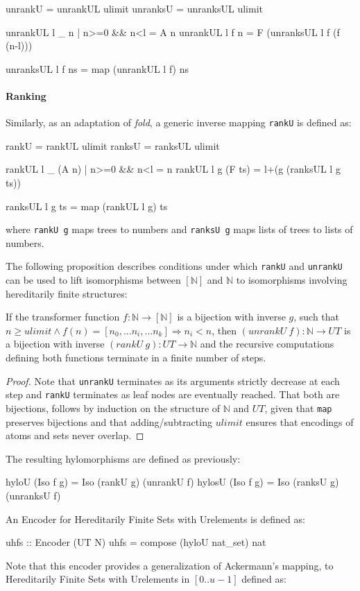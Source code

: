 \documentclass[]{INCLUDES/llncs}
\begin{document}
\begin{code}
unrankU = unrankUL ulimit
unranksU = unranksUL ulimit

unrankUL l _ n | n>=0 && n<l = A n
unrankUL l f n = F (unranksUL l f (f (n-l)))

unranksUL l f ns =  map (unrankUL l f) ns
\end{code}

\paragraph*{Ranking} Similarly, as an adaptation of {\em fold}, a generic
inverse mapping {\tt rankU} is defined as:
\begin{code}
rankU = rankUL ulimit
ranksU = ranksUL ulimit

rankUL l _ (A n) | n>=0 && n<l = n
rankUL l g (F ts) = l+(g (ranksUL l g ts))

ranksUL l g ts = map (rankUL l g) ts
\end{code}
where {\tt rankU g} maps trees to numbers and
{\tt ranksU g} maps lists of trees to lists of numbers.

The following proposition describes conditions under which
{\tt rankU} and {\tt unrankU} can be used to lift isomorphisms
between $[\mathbb{N}]$ and $\mathbb{N}$ to isomorphisms involving
hereditarily finite structures:

\begin{prop}
If the transformer function $f:\mathbb{N} \rightarrow [\mathbb{N}]$ is a bijection 
with inverse $g$, such that 
$n \geq ulimit \wedge f(n)=[n_0,...n_i,...n_k] \Rightarrow n_i<n$, 
then $(unrankU~f) : \mathbb{N} \rightarrow UT$ 
is a bijection  
with inverse $(rankU~ g) : UT \rightarrow \mathbb{N}$ 
and the recursive computations defining both functions
terminate in a finite number of steps.
\end{prop}

\begin{proof} Note that {\tt unrankU} terminates as its arguments strictly
decrease at each step and {\tt rankU} terminates as leaf nodes are eventually
reached. That both are bijections, follows by induction on the 
structure of $\mathbb{N}$ and $UT$,
given that {\tt map} preserves bijections and that adding/subtracting 
{$ulimit$} ensures that encodings of atoms and sets never overlap.
\end{proof}

The resulting hylomorphisms are defined as previously:
\begin{code}
hyloU (Iso f g) = Iso (rankU g) (unrankU f)
hylosU (Iso f g) = Iso (ranksU g) (unranksU f)
\end{code}
An Encoder for Hereditarily Finite Sets with Urelements is defined as:
\begin{code}
uhfs :: Encoder (UT N)
uhfs = compose (hyloU nat_set) nat
\end{code}
Note that this encoder provides a generalization of Ackermann's mapping,
to Hereditarily Finite Sets with Urelements in $[0..u-1]$ defined as:
\end{document}
